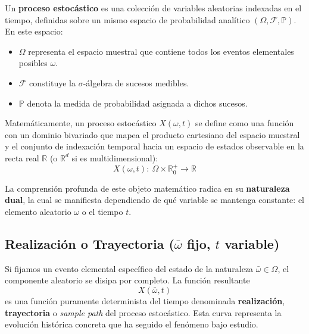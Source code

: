 \begin{definicion}
    Un \textbf{proceso estocástico} es una colección de variables aleatorias indexadas en el tiempo, definidas sobre un mismo espacio de probabilidad analítico $(\Omega, \mathcal{F}, \mathbb{P})$. En este espacio:
    \begin{itemize}
        \item $\Omega$ representa el espacio muestral que contiene todos los eventos elementales posibles $\omega$.
        \item $\mathcal{F}$ constituye la $\sigma$-álgebra de sucesos medibles.
        \item $\mathbb{P}$ denota la medida de probabilidad asignada a dichos sucesos.
    \end{itemize}
    \noindent
    Matemáticamente, un proceso estocástico $X(\omega, t)$ se define como una función con un dominio bivariado que mapea el producto cartesiano del espacio muestral y el conjunto de indexación temporal hacia un espacio de estados observable en la recta real $\mathbb{R}$ (o $\mathbb{R}^d$ si es multidimensional):
    \begin{equation}
        X(\omega, t) : \ \Omega \times \mathbb{R}_0^+ \longrightarrow \mathbb{R}
    \end{equation}
\end{definicion}


\noindent La comprensión profunda de este objeto matemático radica en su \textbf{naturaleza dual}, la cual se manifiesta dependiendo de qué variable se mantenga constante: el elemento aleatorio $\omega$ o el tiempo $t$.

\subsection{Realización o Trayectoria ($ \bar{\omega} $ fijo, $t$ variable)}
\noindent
Si fijamos un evento elemental específico del estado de la naturaleza $\bar{\omega} \in \Omega$, el componente aleatorio se disipa por completo. La función resultante
$$X(\bar{\omega}, t)$$
es una función puramente determinista del tiempo denominada \textbf{realización}, \textbf{trayectoria} o \textit{sample path} del proceso estocástico. Esta curva representa la evolución histórica concreta que ha seguido el fenómeno bajo estudio.

